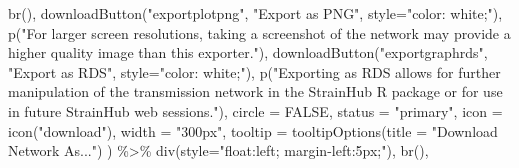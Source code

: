 \documentclass[
]{article}
\newenvironment{Shaded}{\begin{snugshade}}{\end{snugshade}}
\newcommand{\AttributeTok}[1]{\textcolor[rgb]{0.77,0.63,0.00}{#1}}
\newcommand{\ConstantTok}[1]{\textcolor[rgb]{0.00,0.00,0.00}{#1}}
\newcommand{\FunctionTok}[1]{\textcolor[rgb]{0.00,0.00,0.00}{#1}}
\newcommand{\NormalTok}[1]{#1}
\newcommand{\SpecialCharTok}[1]{\textcolor[rgb]{0.00,0.00,0.00}{#1}}
\newcommand{\StringTok}[1]{\textcolor[rgb]{0.31,0.60,0.02}{#1}}
\begin{document}
\begin{Shaded}
\begin{Highlighting}[]
                            \FunctionTok{br}\NormalTok{(),}
                            \FunctionTok{downloadButton}\NormalTok{(}\StringTok{"exportplotpng"}\NormalTok{,}
                                           \StringTok{"Export as PNG"}\NormalTok{,}
                                           \AttributeTok{style=}\StringTok{"color: white;"}\NormalTok{),}
                            \FunctionTok{p}\NormalTok{(}\StringTok{"For larger screen resolutions, taking a screenshot of the network may provide a higher quality image than this exporter."}\NormalTok{),}
                            \FunctionTok{downloadButton}\NormalTok{(}\StringTok{"exportgraphrds"}\NormalTok{,}
                                           \StringTok{"Export as RDS"}\NormalTok{,}
                                           \AttributeTok{style=}\StringTok{"color: white;"}\NormalTok{),}
                            \FunctionTok{p}\NormalTok{(}\StringTok{"Exporting as RDS allows for further manipulation of the transmission network in the StrainHub R package or for use in future StrainHub web sessions."}\NormalTok{),}
                            \AttributeTok{circle =} \ConstantTok{FALSE}\NormalTok{,}
                            \AttributeTok{status =} \StringTok{"primary"}\NormalTok{,}
                            \AttributeTok{icon =} \FunctionTok{icon}\NormalTok{(}\StringTok{"download"}\NormalTok{),}
                            \AttributeTok{width =} \StringTok{"300px"}\NormalTok{,}
                            \AttributeTok{tooltip =} \FunctionTok{tooltipOptions}\NormalTok{(}\AttributeTok{title =} \StringTok{"Download Network As..."}\NormalTok{)}
\NormalTok{                          ) }\SpecialCharTok{\%\textgreater{}\%} \FunctionTok{div}\NormalTok{(}\AttributeTok{style=}\StringTok{"float:left; margin{-}left:5px;"}\NormalTok{),}
                          \FunctionTok{br}\NormalTok{(),}


\end{Highlighting}
\end{Shaded}
\end{document}
